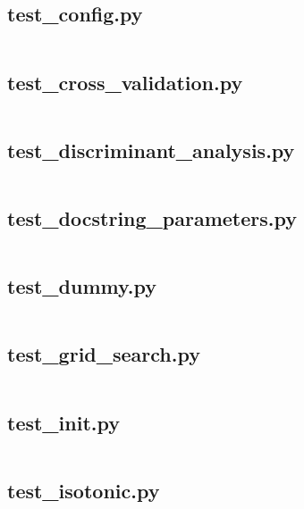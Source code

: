\documentclass{article}
\begin{document}
\subsection{test\_config.py}
\inputminted{python}{/home/dufferzafar/dev/@clones/scikit-learn/sklearn/tests/test_config.py}
\newpage

\subsection{test\_cross\_validation.py}
\inputminted{python}{/home/dufferzafar/dev/@clones/scikit-learn/sklearn/tests/test_cross_validation.py}
\newpage

\subsection{test\_discriminant\_analysis.py}
\inputminted{python}{/home/dufferzafar/dev/@clones/scikit-learn/sklearn/tests/test_discriminant_analysis.py}
\newpage

\subsection{test\_docstring\_parameters.py}
\inputminted{python}{/home/dufferzafar/dev/@clones/scikit-learn/sklearn/tests/test_docstring_parameters.py}
\newpage

\subsection{test\_dummy.py}
\inputminted{python}{/home/dufferzafar/dev/@clones/scikit-learn/sklearn/tests/test_dummy.py}
\newpage

\subsection{test\_grid\_search.py}
\inputminted{python}{/home/dufferzafar/dev/@clones/scikit-learn/sklearn/tests/test_grid_search.py}
\newpage

\subsection{test\_init.py}
\inputminted{python}{/home/dufferzafar/dev/@clones/scikit-learn/sklearn/tests/test_init.py}
\newpage

\subsection{test\_isotonic.py}
\inputminted{python}{/home/dufferzafar/dev/@clones/scikit-learn/sklearn/tests/test_isotonic.py}
\newpage
\end{document}
